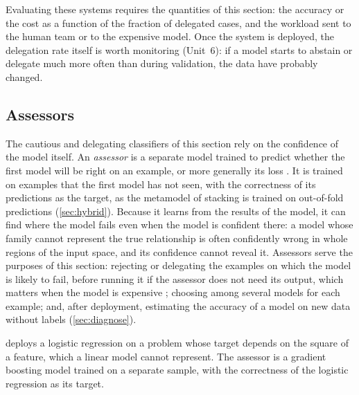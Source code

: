 Evaluating these systems requires the quantities of this section: the accuracy or the cost as a
function of the fraction of delegated cases, and the workload sent to the human team or to the
expensive model. Once the system is deployed, the delegation rate itself is worth monitoring
(Unit~6): if a model starts to abstain or delegate much more often than during validation, the
data have probably changed.

\subsection{Assessors\extsec}\label{sec:assessors}

The cautious and delegating classifiers of this section rely on the confidence of the model
itself. An \emph{assessor} is a separate model trained to predict whether the first
model will be right on an example, or more generally its loss \citep{hernandezorallo2022training}.
It is trained on examples that the first model has not seen, with the correctness of its
predictions as the target, as the metamodel of stacking is trained on out-of-fold predictions
(\cref{sec:hybrid}). Because it learns from the results of the model, it can find where the model
fails even when the model is confident there: a model whose family cannot represent the true
relationship is often confidently wrong in whole regions of the input space, and its confidence
cannot reveal it. Assessors serve the purposes of this section: rejecting or delegating the
examples on which the model is likely to fail, before running it if the assessor does not need
its output, which matters when the model is expensive \citep{zhou2022reject}; choosing among
several models for each example; and, after deployment, estimating the accuracy of a model on new
data without labels (\cref{sec:diagnose}).

 deploys a logistic regression on a problem whose target depends
on the square of a feature, which a linear model cannot represent. The assessor is a gradient
boosting model trained on a separate sample, with the correctness of the logistic
regression as its target.


